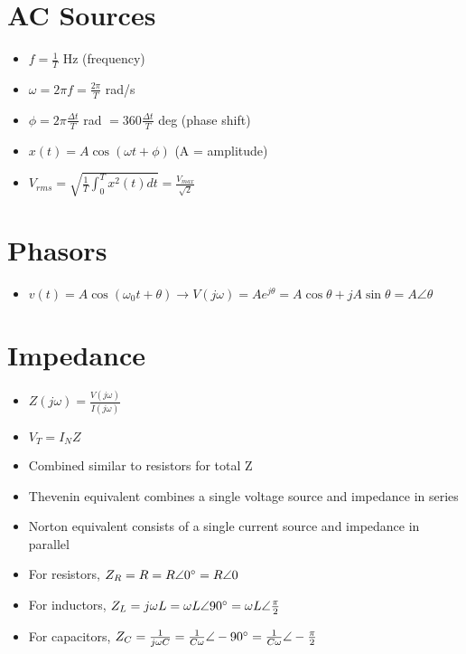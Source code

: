 \documentclass [12pt] {article}
\begin{document}
\begin{multicols*}{2}
\section{AC Sources}
	\begin{itemize}
		\item $f = \frac{1}{T}$ Hz (frequency) 
		\item $\omega = 2\pi f = \frac{2\pi}{T} $ rad/s 
		\item $\phi = 2\pi\frac{\Delta t}{T}$ rad $ = 360\frac{\Delta t}{T}$ deg (phase shift)
		\item $x(t) = A\cos(\omega t + \phi)$ (A = amplitude)
		\item $V_{rms} = \sqrt{\frac{1}{T}\int_0^Tx^2(t)dt} = \frac{V_{max}}{\sqrt{2}} $
	\end{itemize}
\section{Phasors}
	\begin{itemize}
		\item $v(t) = A\cos(\omega_0t + \theta) \rightarrow V(j\omega) = Ae^{j\theta} = A\cos\theta + jA\sin\theta = A \angle\theta $
	\end{itemize}
\section{Impedance}
	\begin{itemize}
		\item $Z(j\omega) = \frac{V(j\omega)}{I(j\omega)} $
		\item $V_T = I_NZ$ 
		\item Combined similar to resistors for total Z 
		\item Thevenin equivalent combines a single voltage source and impedance in series 
		\item Norton equivalent consists of a single current source and impedance in parallel 
		\item For resistors, $Z_R = R = R \angle 0\degree = R \angle 0$
		\item For inductors, $Z_L = j\omega L = \omega L\angle 90\degree = \omega L \angle \frac{\pi}{2}$
		\item For capacitors, $Z_C = \frac{1}{j\omega C} = \frac{1}{C\omega}\angle -90\degree = \frac{1}{C\omega}\angle -\frac{\pi}{2}$
	\end{itemize}

\end{multicols*}
\end{document}
